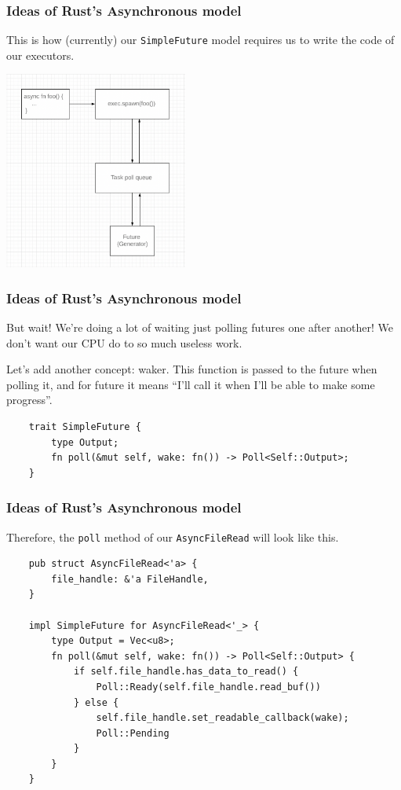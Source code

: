 \documentclass[aspectratio=1610,t]{beamer}
\begin{document}

\begin{frame}[fragile]
\frametitle{Ideas of Rust's Asynchronous model}
This is how (currently) our \texttt{SimpleFuture} model requires us to write the code of our executors.

\begin{center}
    \includegraphics[width=\textwidth,height=6.5cm,keepaspectratio]{images/simple-model.png}
\end{center}
\end{frame}


\begin{frame}[fragile]
\frametitle{Ideas of Rust's Asynchronous model}
But wait! We're doing a lot of waiting just polling futures one after another! We don't want our CPU do to so much useless work.

Let's add another concept: waker. This function is passed to the future when polling it, and for future it means ``I'll call it when I'll be able to make some progress''.

\begin{verbatim}
    trait SimpleFuture {
        type Output;
        fn poll(&mut self, wake: fn()) -> Poll<Self::Output>;
    }
\end{verbatim}
\end{frame}


\begin{frame}[fragile]
\frametitle{Ideas of Rust's Asynchronous model}
Therefore, the \texttt{poll} method of our \texttt{AsyncFileRead} will look like this.

\begin{verbatim}
    pub struct AsyncFileRead<'a> {
        file_handle: &'a FileHandle,
    }

    impl SimpleFuture for AsyncFileRead<'_> {
        type Output = Vec<u8>;
        fn poll(&mut self, wake: fn()) -> Poll<Self::Output> {
            if self.file_handle.has_data_to_read() {
                Poll::Ready(self.file_handle.read_buf())
            } else {
                self.file_handle.set_readable_callback(wake);
                Poll::Pending
            }
        }
    }
\end{verbatim}
\end{frame}
\end{document}
